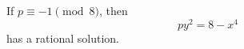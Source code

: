 \begin{proposition}
    If $p\equiv-1\pmod8$, then
\[
    py^2=8-x^4
\]
    has a rational solution.
\end{proposition}
